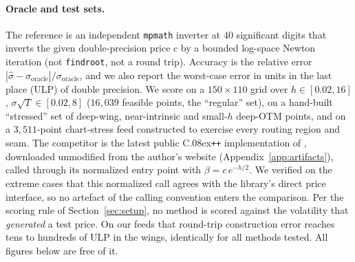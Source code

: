 \documentclass[11pt]{article}
\begin{document}
\paragraph{Oracle and test sets.}
The reference is an independent \texttt{mpmath} inverter at 40 significant digits that inverts the given double-precision price $c$ by a bounded log-space Newton iteration (not \texttt{findroot}, not a round trip). Accuracy is the relative error $|\hat\sigma-\sigma_{\text{oracle}}|/\sigma_{\text{oracle}}$, and we also report the worst-case error in units in the last place (ULP) of double precision. We score on a $150\times110$ grid over $h\in[0.02,16]$, $\sigma\sqrt T\in[0.02,8]$ ($16{,}039$ feasible points, the ``regular'' set), on a hand-built ``stressed'' set of deep-wing, near-intrinsic and small-$h$ deep-OTM points, and on a $3{,}511$-point chart-stress feed constructed to exercise every routing region and seam. The competitor is the latest public C\raise.08ex\hbox{\tt ++} implementation of \citet{jackel2015rational}, downloaded unmodified from the author's website (Appendix~\ref{app:artifacts}), called through its normalized entry point with $\beta=c\,e^{-h/2}$. We verified on the extreme cases that this normalized call agrees with the library's direct price interface, so no artefact of the calling convention enters the comparison. Per the scoring rule of Section~\ref{sec:setup}, no method is scored against the volatility that \emph{generated} a test price. On our feeds that round-trip construction error reaches tens to hundreds of ULP in the wings, identically for all methods tested. All figures below are free of it.
\end{document}

